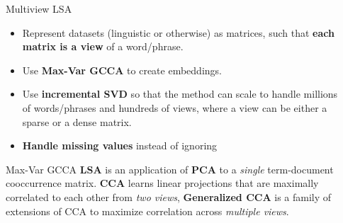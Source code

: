 \begin{frame}[t]
\begin{columns}[t]

\begin{column}{\sepwid}\end{column}
  
\begin{column}{\onecolwid}\vspace{-0.4in}
  \begin{alertblock}{Multiview LSA}
    \begin{itemize}
    \item Represent datasets (linguistic or otherwise) as matrices, such
      that \textbf{each matrix is a view} of a word/phrase.
    \item Use \textbf{Max-Var GCCA} to create embeddings.
    \item Use \textbf{incremental SVD} so that the method can scale to handle millions
      of words/phrases and hundreds of views, where a view can be
      either a sparse or a dense matrix.
    \item \textbf{Handle missing values} instead of ignoring
    \end{itemize}
  \end{alertblock}
  \begin{block}{Max-Var GCCA}
    \textbf{LSA} is an application of \textbf{PCA} to a
    \textit{single} term-document 
    cooccurrence matrix. \textbf{CCA} learns linear projections
    that are maximally correlated to each other from \textit{two
      views}, \textbf{Generalized CCA} is a family of extensions of CCA to
    maximize correlation across \textit{multiple views}.


\end{block}
\end{column}
\end{columns}
\end{frame}
